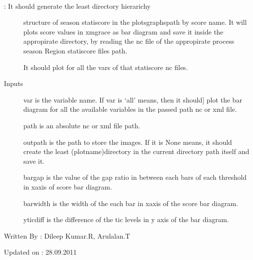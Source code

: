 \documentclass[letterpaper,10pt,english]{sphinxmanual}
\begin{document}
\begin{fulllineitems}
\label{diagnosis:generate_statistical_score_bars.genBarDiagrams}~\begin{description}
\item[{: It should generate the least directory hierarichy}] \leavevmode
structure of season statiscore in the plotsgraphspath by score name.
It will plots score values in xmgrace as bar diagram and save it
inside the appropirate directory, by reading the nc file of the
appropirate process season Region statiscore files path.

It should plot for all the vars of that statiscore nc files.

\item[{Inputs}] \leavevmode{[}var is the variable name. If var is `all' means, then it should{]}
plot the bar diagram for all the available variables in the passed
path nc or xml file.

path is an absolute nc or xml file path.

outpath is the path to store the images. If it is None means, it
should create the least (plotname)directory in the current
directory path itself and save it.

bargap is the value of the gap ratio in between each bars of each
threshold in xaxis of score bar diagram.

barwidth is the width of the each bar in xaxis of the score
bar diagram.

yticdiff is the difference of the tic levels in y axis of the
bar diagram.

\end{description}

Written By : Dileep Kumar.R, Arulalan.T

Updated on : 28.09.2011

\end{fulllineitems}

\end{document}
